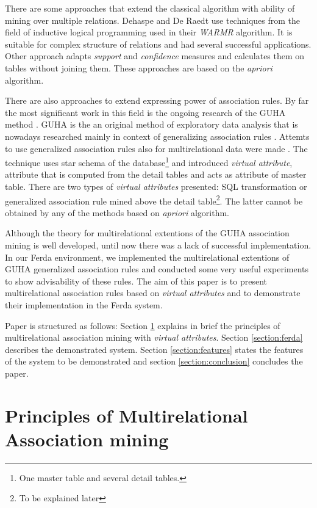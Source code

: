 \documentclass[conference]{IEEEtran}
\begin{document}
There are some approaches that extend the classical algorithm with ability
of mining over multiple relations. Dehaspe and De Raedt\cite{Warmr} use 
techniques from the field of inductive logical programming used in their 
\emph{WARMR} algorithm. It is suitable for complex structure of relations 
and had several successful applications. Other approach \cite{Connection}
adapts \emph{support} and \emph{confidence} measures and calculates them on
tables without joining them. These approaches are based on the \emph{apriori}
algorithm.

There are also approaches to extend expressing power of association rules.
By far the most significant work in this field is the ongoing research of
the GUHA method \cite{GUHA1, GUHA2}. GUHA is the an original method of 
exploratory data analysis that is nowadays researched mainly in context of
generalizing association rules \cite{Rauch2, Alternative}. Attemts to
use generalized association rules also for multirelational data were made
\cite{Rauch1, Karban}. The technique uses star schema of the 
database\footnote{One master table and several detail tables.} and introduced
\emph{virtual attribute}, attribute that is computed from the detail tables
and acts as attribute of master table. There are two types of 
\emph{virtual attributes} presented: SQL transformation or generalized
association rule mined above the detail table\footnote{To be explained
later}. The latter cannot be obtained by any of the methods based on 
\emph{apriori} algorithm. 

Although the theory for multirelational extentions of the GUHA association
mining is well developed, until now there was a lack of successful 
implementation. In our Ferda environment, we implemented the multirelational
extentions of GUHA generalized association rules and conducted some very
useful experiments to show advisability of these rules. The aim of this paper
is to present multirelational association rules based on \emph{virtual attributes}
and to demonstrate their implementation in the Ferda system. 

Paper is structured as follows: Section \ref{section:principles} explains in brief
the principles of multirelational association mining with \emph{virtual attributes}.
Section \ref{section:ferda} describes the demonstrated system. Section 
\ref{section:features} states the features of the system to be demonstrated
and section \ref{section:conclusion} concludes the paper. 

\section{Principles of Multirelational Association mining}
\label{section:principles}
\end{document}
